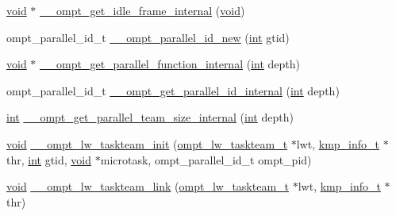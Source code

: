 \begin{DoxyCompactItemize}
\item 
\hyperlink{ittnotify__static_8h_af941d56e55e3c5465135b60c4d6343ed}{void} $\ast$ \hyperlink{ompt-specific_8c_a4c44e8a74cf840619c14fe4ba381a2fd}{\-\_\-\-\_\-ompt\-\_\-get\-\_\-idle\-\_\-frame\-\_\-internal} (\hyperlink{ittnotify__static_8h_af941d56e55e3c5465135b60c4d6343ed}{void})
\item 
ompt\-\_\-parallel\-\_\-id\-\_\-t \hyperlink{ompt-specific_8c_a541d97d3f1e1d09a459326dd60c630ce}{\-\_\-\-\_\-ompt\-\_\-parallel\-\_\-id\-\_\-new} (\hyperlink{ittnotify__static_8h_a8b8dcd723308a8cb5d84277c7a3fff70}{int} gtid)
\item 
\hyperlink{ittnotify__static_8h_af941d56e55e3c5465135b60c4d6343ed}{void} $\ast$ \hyperlink{ompt-specific_8c_ad89dd862500b2e6384515b537f60b249}{\-\_\-\-\_\-ompt\-\_\-get\-\_\-parallel\-\_\-function\-\_\-internal} (\hyperlink{ittnotify__static_8h_a8b8dcd723308a8cb5d84277c7a3fff70}{int} depth)
\item 
ompt\-\_\-parallel\-\_\-id\-\_\-t \hyperlink{ompt-specific_8c_a030a00d9dd5d82e4a488dd3da4ad2cd3}{\-\_\-\-\_\-ompt\-\_\-get\-\_\-parallel\-\_\-id\-\_\-internal} (\hyperlink{ittnotify__static_8h_a8b8dcd723308a8cb5d84277c7a3fff70}{int} depth)
\item 
\hyperlink{ittnotify__static_8h_a8b8dcd723308a8cb5d84277c7a3fff70}{int} \hyperlink{ompt-specific_8c_a7f28079891fe51d35e74a3b69e9d40e9}{\-\_\-\-\_\-ompt\-\_\-get\-\_\-parallel\-\_\-team\-\_\-size\-\_\-internal} (\hyperlink{ittnotify__static_8h_a8b8dcd723308a8cb5d84277c7a3fff70}{int} depth)
\item 
\hyperlink{ittnotify__static_8h_af941d56e55e3c5465135b60c4d6343ed}{void} \hyperlink{ompt-specific_8c_aa3b1a660dbaf7d2a72732e1eebc4d3db}{\-\_\-\-\_\-ompt\-\_\-lw\-\_\-taskteam\-\_\-init} (\hyperlink{ompt-internal_8h_a9efdb170346e988130296a7bb0cb861c}{ompt\-\_\-lw\-\_\-taskteam\-\_\-t} $\ast$lwt, \hyperlink{kmp_8h_a194859801fe16b326efe34501a37c30a}{kmp\-\_\-info\-\_\-t} $\ast$thr, \hyperlink{ittnotify__static_8h_a8b8dcd723308a8cb5d84277c7a3fff70}{int} gtid, \hyperlink{ittnotify__static_8h_af941d56e55e3c5465135b60c4d6343ed}{void} $\ast$microtask, ompt\-\_\-parallel\-\_\-id\-\_\-t ompt\-\_\-pid)
\item 
\hyperlink{ittnotify__static_8h_af941d56e55e3c5465135b60c4d6343ed}{void} \hyperlink{ompt-specific_8c_a3272fe5fad9706e746997b6c6aa55458}{\-\_\-\-\_\-ompt\-\_\-lw\-\_\-taskteam\-\_\-link} (\hyperlink{ompt-internal_8h_a9efdb170346e988130296a7bb0cb861c}{ompt\-\_\-lw\-\_\-taskteam\-\_\-t} $\ast$lwt, \hyperlink{kmp_8h_a194859801fe16b326efe34501a37c30a}{kmp\-\_\-info\-\_\-t} $\ast$thr)

\end{DoxyCompactItemize}
